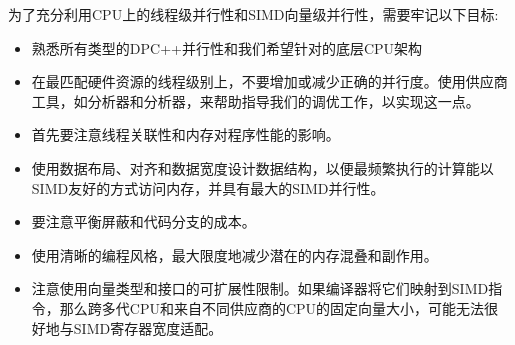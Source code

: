 为了充分利用CPU上的线程级并行性和SIMD向量级并行性，需要牢记以下目标:\par

\begin{itemize}
	\item 熟悉所有类型的DPC++并行性和我们希望针对的底层CPU架构
	\item 在最匹配硬件资源的线程级别上，不要增加或减少正确的并行度。使用供应商工具，如分析器和分析器，来帮助指导我们的调优工作，以实现这一点。
	\item 首先要注意线程关联性和内存对程序性能的影响。
	\item 使用数据布局、对齐和数据宽度设计数据结构，以便最频繁执行的计算能以SIMD友好的方式访问内存，并具有最大的SIMD并行性。
	\item 要注意平衡屏蔽和代码分支的成本。
	\item 使用清晰的编程风格，最大限度地减少潜在的内存混叠和副作用。
	\item 注意使用向量类型和接口的可扩展性限制。如果编译器将它们映射到SIMD指令，那么跨多代CPU和来自不同供应商的CPU的固定向量大小，可能无法很好地与SIMD寄存器宽度适配。
\end{itemize}






\newpage